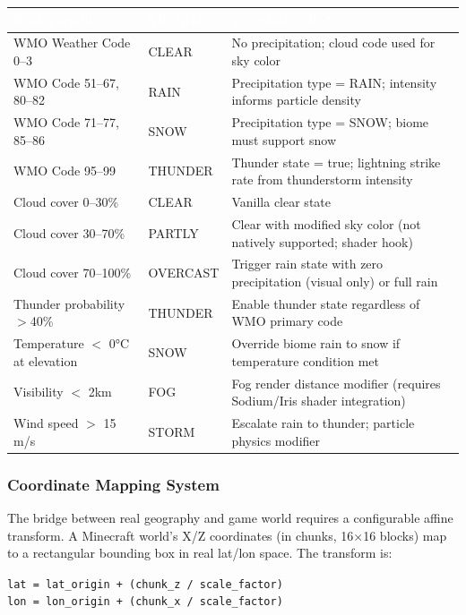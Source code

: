 \documentclass[11pt,letterpaper]{article}
\newcommand{\tableheader}[1]{\textbf{\sffamily\textcolor{white}{#1}}}
\begin{document}
\begin{center}
\begin{tabularx}{\textwidth}{L{3.5cm}L{2.5cm}X}
\toprule
{}
\tableheader{Real Variable} & \tableheader{MC State} & \tableheader{Translation Rule} \\
\midrule
WMO Weather Code 0--3 & CLEAR & No precipitation; cloud code used for sky color \\
WMO Code 51--67, 80--82 & RAIN & Precipitation type = RAIN; intensity informs particle density \\
WMO Code 71--77, 85--86 & SNOW & Precipitation type = SNOW; biome must support snow \\
WMO Code 95--99 & THUNDER & Thunder state = true; lightning strike rate from thunderstorm intensity \\
Cloud cover 0--30\% & CLEAR & Vanilla clear state \\
Cloud cover 30--70\% & PARTLY & Clear with modified sky color (not natively supported; shader hook) \\
Cloud cover 70--100\% & OVERCAST & Trigger rain state with zero precipitation (visual only) or full rain \\
Thunder probability $>$40\% & THUNDER & Enable thunder state regardless of WMO primary code \\
Temperature $<$ 0°C at elevation & SNOW & Override biome rain to snow if temperature condition met \\
Visibility $<$ 2km & FOG & Fog render distance modifier (requires Sodium/Iris shader integration) \\
Wind speed $>$ 15 m/s & STORM & Escalate rain to thunder; particle physics modifier \\
\bottomrule
\end{tabularx}
\end{center}

\subsubsection{Coordinate Mapping System}

The bridge between real geography and game world requires a configurable affine transform. A Minecraft world's X/Z coordinates (in chunks, 16×16 blocks) map to a rectangular bounding box in real lat/lon space. The transform is:

\begin{center}
\texttt{lat = lat\_origin + (chunk\_z / scale\_factor)}\\
\texttt{lon = lon\_origin + (chunk\_x / scale\_factor)}
\end{center}
\end{document}
